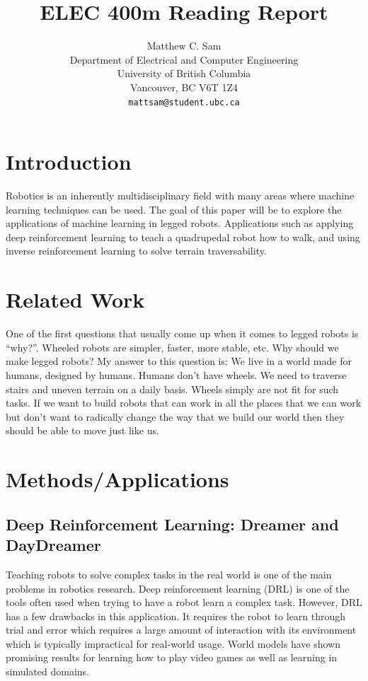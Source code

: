 \documentclass{article}
\title{ELEC 400m Reading Report}
\author{%
  Matthew C. Sam \\
  Department of Electrical and Computer Engineering\\
  University of British Columbia\\
  Vancouver, BC V6T 1Z4\\
  \texttt{mattsam@student.ubc.ca} \\
}
\begin{document}
\maketitle
\section{Introduction}

  Robotics is an inherently multidisciplinary field with many areas where machine learning techniques can be used. The goal of this paper will be to explore the applications of machine learning in legged robots. Applications such as applying deep reinforcement learning to teach a quadrupedal robot how to walk, and using inverse reinforcement learning to solve terrain traversability.

\section{Related Work}

One of the first questions that usually come up when it comes to legged robots is “why?”. Wheeled robots are simpler, faster, more stable, etc. Why should we make legged robots? My answer to this question is: We live in a world made for humans, designed by humans. Humans don’t have wheels. We need to traverse stairs and uneven terrain on a daily basis. Wheels simply are not fit for such tasks. If we want to build robots that can work in all the places that we can work but don’t want to radically change the way that we build our world then they should be able to move just like us.

\section{Methods/Applications}

\subsection{Deep Reinforcement Learning: Dreamer and DayDreamer}

Teaching robots to solve complex tasks in the real world is one of the main problems in robotics research. Deep reinforcement learning (DRL) is one of the tools often used when trying to have a robot learn a complex task. However, DRL has a few drawbacks in this application. It requires the robot to learn through trial and error which requires a large amount of interaction with its environment which is typically impractical for real-world usage. World models have shown promising results for learning how to play video games as well as learning in simulated domains. 
\end{document}
